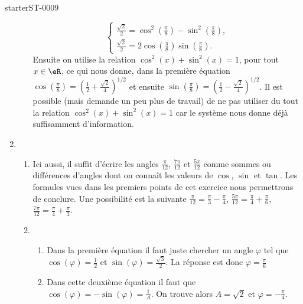 \begin{corrige}{starterST-0009}
\begin{enumerate}
\begin{enumerate}
\begin{equation*}
\begin{cases}
   \frac{\sqrt{2}}{2} =  \cos^2 \left(\frac{\pi}{8}\right) - \sin^2 \left(\frac{\pi}{8}\right) , \\
   \frac{\sqrt{2}}{2} = 2\cos \left(\frac{\pi}{8}\right)\sin \left(\frac{\pi}{8}\right).
  \end{cases}
\end{equation*}
Ensuite on utilise la relation $\cos^2(x) + \sin^2(x) =1$, pour tout $x\in \eR$, ce qui nous donne, dans la première équation $\displaystyle \cos \left(\frac{\pi}{8}\right) = \left(\frac{1}{2} + \frac{\sqrt{2}}{4}\right)^{1/2}$ et ensuite  $\displaystyle \sin \left(\frac{\pi}{8}\right) = \left(\frac{1}{2} -\frac{\sqrt{2}}{4}\right)^{1/2}$. Il est possible (mais demande un peu plus de travail) de ne pas utiliser du tout la relation $\cos^2(x) + \sin^2(x) =1$ car le système nous donne déjà suffisamment d'information. 
\end{enumerate}
\item \begin{enumerate}
\item Ici aussi, il suffit d'écrire les angles $\displaystyle \frac{\pi}{12}$, $\displaystyle \frac{7\pi}{12}$ et $\displaystyle \frac{5\pi}{12}$ comme sommes ou différences d'angles dont on connaît les valeurs de $\cos$, $\sin$ et $\tan$. Les formules vues dans les premiers points de cet exercice nous permettrons de conclure. Une possibilité est la suivante $\displaystyle \frac{\pi}{12} =\frac{\pi}{3} - \frac{\pi}{4} $,  $\displaystyle \frac{5\pi}{12} =\frac{\pi}{4} + \frac{\pi}{6} $, $\displaystyle \frac{7\pi}{12} =\frac{\pi}{4} + \frac{\pi}{3} $. 
\item 
  \begin{enumerate}
  \item Dans la première équation il faut juste chercher un angle $\varphi$ tel que $\cos(\varphi) = \frac{1}{2}$ et $\sin(\varphi) = \frac{\sqrt{3}}{2} $. La réponse est donc $\varphi = \frac{\pi}{6}$
  \item Dans cette deuxième équation il faut que $\cos(\varphi) = - \sin(\varphi) = \frac{1}{A}$. On trouve alors $A = \sqrt{2}$ et $\varphi = -\frac{\pi}{4}$.
  \end{enumerate}
\end{enumerate}
\end{enumerate}

\end{corrige}
